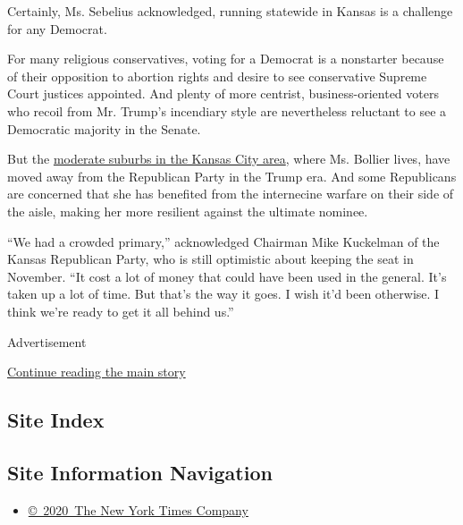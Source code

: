 Certainly, Ms. Sebelius acknowledged, running statewide in Kansas is a
challenge for any Democrat.

For many religious conservatives, voting for a Democrat is a nonstarter
because of their opposition to abortion rights and desire to see
conservative Supreme Court justices appointed. And plenty of more
centrist, business-oriented voters who recoil from Mr. Trump's
incendiary style are nevertheless reluctant to see a Democratic majority
in the Senate.

But the
\href{https://www.nytimes3xbfgragh.onion/2020/05/30/us/politics/kansas-senate-kobach.html}{moderate
suburbs in the Kansas City area}, where Ms. Bollier lives, have moved
away from the Republican Party in the Trump era. And some Republicans
are concerned that she has benefited from the internecine warfare on
their side of the aisle, making her more resilient against the ultimate
nominee.

``We had a crowded primary,'' acknowledged Chairman Mike Kuckelman of
the Kansas Republican Party, who is still optimistic about keeping the
seat in November. ``It cost a lot of money that could have been used in
the general. It's taken up a lot of time. But that's the way it goes. I
wish it'd been otherwise. I think we're ready to get it all behind us.''

Advertisement

\protect\hyperlink{after-bottom}{Continue reading the main story}

\hypertarget{site-index}{%
\subsection{Site Index}\label{site-index}}

\hypertarget{site-information-navigation}{%
\subsection{Site Information
Navigation}\label{site-information-navigation}}

\begin{itemize}
\tightlist
\item
  \href{https://help.nytimes3xbfgragh.onion/hc/en-us/articles/115014792127-Copyright-notice}{©~2020~The
  New York Times Company}
\end{itemize}

